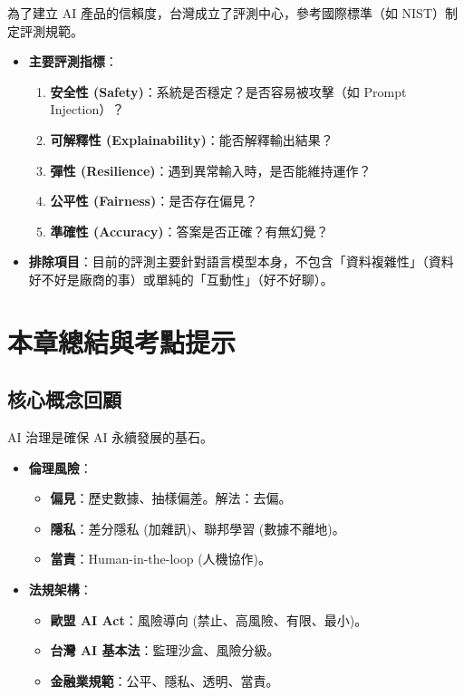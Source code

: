 \documentclass[
  letterpaper,
  DIV=11,
  numbers=noendperiod]{scrreprt}
\providecommand{\tightlist}{%
  \setlength{\itemsep}{0pt}\setlength{\parskip}{0pt}}
\begin{document}
為了建立 AI 產品的信賴度，台灣成立了評測中心，參考國際標準（如
NIST）制定評測規範。

\begin{itemize}
\tightlist
\item
  \textbf{主要評測指標}：

  \begin{enumerate}
  \def\labelenumi{\arabic{enumi}.}
  \tightlist
  \item
    \textbf{安全性 (Safety)}：系統是否穩定？是否容易被攻擊（如 Prompt
    Injection）？
  \item
    \textbf{可解釋性 (Explainability)}：能否解釋輸出結果？
  \item
    \textbf{彈性 (Resilience)}：遇到異常輸入時，是否能維持運作？
  \item
    \textbf{公平性 (Fairness)}：是否存在偏見？
  \item
    \textbf{準確性 (Accuracy)}：答案是否正確？有無幻覺？
  \end{enumerate}
\item
  \textbf{排除項目}：目前的評測主要針對語言模型本身，不包含「資料複雜性」（資料好不好是廠商的事）或單純的「互動性」（好不好聊）。
\end{itemize}

\chapter{本章總結與考點提示}\label{sec-chapter11-summary}

\section{核心概念回顧}\label{ux6838ux5fc3ux6982ux5ff5ux56deux9867-10}

AI 治理是確保 AI 永續發展的基石。

\begin{itemize}
\tightlist
\item
  \textbf{倫理風險}：

  \begin{itemize}
  \tightlist
  \item
    \textbf{偏見}：歷史數據、抽樣偏差。解法：去偏。
  \item
    \textbf{隱私}：差分隱私 (加雜訊)、聯邦學習 (數據不離地)。
  \item
    \textbf{當責}：Human-in-the-loop (人機協作)。
  \end{itemize}
\item
  \textbf{法規架構}：

  \begin{itemize}
  \tightlist
  \item
    \textbf{歐盟 AI Act}：風險導向 (禁止、高風險、有限、最小)。
  \item
    \textbf{台灣 AI 基本法}：監理沙盒、風險分級。
  \item
    \textbf{金融業規範}：公平、隱私、透明、當責。
  \end{itemize}
\end{itemize}
\end{document}
